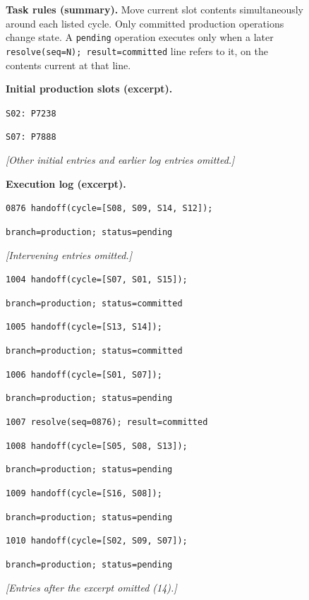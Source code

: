\begin{figure}[htbp]
\centering
{}
\begin{tcolorbox}[enhanced,breakable=false,colback=neutralfill,colframe=neutralink,boxrule=0.7pt,arc=1mm,fonttitle=\bfseries\small,title={Warehouse dispatch --- deferred\_0002}]
\small
\textbf{Task rules (summary).} Move current slot contents simultaneously
around each listed cycle. Only committed production operations change state.
A \texttt{pending} operation executes only when a later \texttt{resolve(seq=N); result=committed} line refers to it, on the contents current at that line.
\medskip\par
\textbf{Initial production slots (excerpt).}\par
\texttt{S02: P7238}\par
\texttt{S07: P7888}\par
\emph{[Other initial entries and earlier log entries omitted.]}\par
\medskip
\textbf{Execution log (excerpt).}\par
\texttt{0876 handoff(cycle=[S08, S09, S14, S12]);}\par
\texttt{branch=production; status=pending}\par
\emph{[Intervening entries omitted.]}\par
\texttt{1004 handoff(cycle=[S07, S01, S15]);}\par
\texttt{branch=production; status=committed}\par
\texttt{1005 handoff(cycle=[S13, S14]);}\par
\texttt{branch=production; status=committed}\par
\texttt{1006 handoff(cycle=[S01, S07]);}\par
\texttt{branch=production; status=pending}\par
\texttt{1007 resolve(seq=0876); result=committed}\par
\texttt{1008 handoff(cycle=[S05, S08, S13]);}\par
\texttt{branch=production; status=pending}\par
\texttt{1009 handoff(cycle=[S16, S08]);}\par
\texttt{branch=production; status=pending}\par
\texttt{1010 handoff(cycle=[S02, S09, S07]);}\par
\texttt{branch=production; status=pending}\par
\emph{[Entries after the excerpt omitted (14).]}\par

\end{tcolorbox}
\end{figure}
